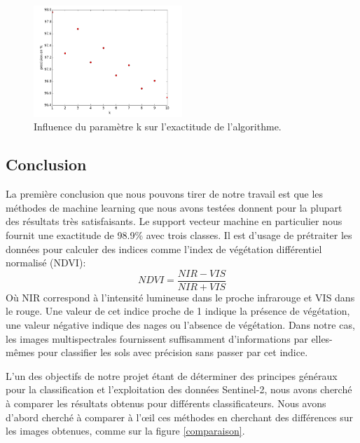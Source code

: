 \documentclass[a4paper,10pt]{article}
\begin{document}
\begin{figure}[H]
  \centering
    \includegraphics[width=0.5\textwidth]{influencek}
  \caption{Influence du paramètre k sur l'exactitude de l'algorithme.}
  \label{fig:kNN}
\end{figure}

\subsection{Conclusion}
La première conclusion que nous pouvons tirer de notre travail est que les méthodes de machine learning que nous avons testées donnent pour la plupart des résultats très satisfaisants. Le support vecteur machine en particulier nous fournit une exactitude de 98.9\% avec trois classes. Il est d'usage de prétraiter les données pour calculer des indices comme l'index de végétation différentiel normalisé (NDVI)\cite{NDVI}:
\begin{equation}
NDVI=\frac{NIR-VIS}{NIR+VIS}
\end{equation}
Où NIR correspond à l'intensité lumineuse dans le proche infrarouge et VIS dans le rouge. Une valeur de cet indice proche de 1 indique la présence de végétation, une valeur négative indique des nages ou l'absence de végétation. Dans notre cas, les images multispectrales fournissent suffisamment d'informations par elles-mêmes pour classifier les sols avec précision sans passer par cet indice.

L'un des objectifs de notre projet étant de déterminer des principes généraux pour la classification et l'exploitation des données Sentinel-2, nous avons cherché à comparer les résultats obtenus pour différents classificateurs. Nous avons d'abord cherché à comparer à l'œil ces méthodes en cherchant des différences sur les images obtenues, comme sur la figure \ref{comparaison}.
\end{document}
